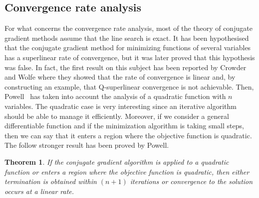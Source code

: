 \documentclass[11pt]{article}
\newtheorem{theorem}{Theorem}[section]
\newcommand{\cac}[1]{{\textcolor{blue}[\textcolor{blue}{\bf{AC: }}{ \textcolor{blue}
              {#1}\textcolor{blue}]}}}
\begin{document}

\subsection{Convergence rate analysis}
For what concerns the convergence rate analysis, most of the theory of conjugate gradient methods assume that the line search is exact. It has been hypothesised that the conjugate gradient method for minimizing functions of several variables has a superlinear rate of convergence, but it was later proved that this hypothesis was false. In fact, the first result on this subject has been reported by Crowder and Wolfe \cite{Crowder_rate} where they showed that the rate of convergence is linear and, by constructing an example, that Q-superlinear convergence is not achievable. Then, Powell~\cite{powell_rate_conv} has taken into account the analysis of a quadratic function with $n$ variables.
The quadratic case is very interesting since an iterative algorithm should be able to manage it efficiently. Moreover, if we consider a general differentiable function and if the minimization algorithm is taking small steps, then we can say that it enters a region where the objective function is quadratic. The follow stronger result has been proved by Powell. 

\begin{theorem}
If the conjugate gradient algorithm is applied to a quadratic function or enters a region where the objective function is quadratic,
then either termination is obtained within $(n + 1)$ iterations or convergence to the solution occurs at a linear rate.
\end{theorem}
\end{document}
